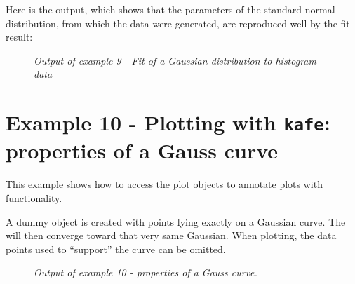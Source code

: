 \documentclass[a4paper,10pt,english]{sphinxmanual}
\begin{document}
Here is the output, which shows that the parameters of the
standard normal distribution, from which the data were generated,
are reproduced well by the fit result:
\begin{figure}[htbp]
\centering
\capstart

\caption{\emph{Output of example 9 - Fit of a Gaussian distribution to histogram data}}\end{figure}


\section{Example 10 - Plotting with \texttt{kafe}: properties of a Gauss curve}
\label{index:example-10-plotting-with-kafe-properties-of-a-gauss-curve}
This example shows how to access the  plot objects
to annotate plots with  functionality.

A dummy object {\hyperref[index:kafe.dataset.Dataset]{}} is
created with points lying exactly on a Gaussian curve.
The {\hyperref[index:kafe.fit.Fit]{}} will then converge toward
that very same Gaussian. When plotting, the data points
used to ``support'' the curve can be omitted.
\begin{figure}[htbp]
\centering
\capstart

\caption{\emph{Output of example 10 - properties of a Gauss curve.}}\end{figure}
\end{document}
